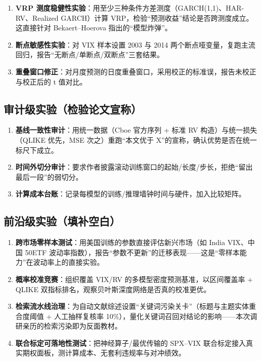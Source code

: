 \documentclass[11pt,a4paper]{article}
\begin{document}
\begin{enumerate}[leftmargin=2.2em]
  \item \textbf{VRP 测度稳健性实验}：用至少三种条件方差测度（GARCH(1,1)、HAR-RV、Realized GARCH）计算 VRP，检验“预测收益”结论是否跨测度成立。这直接针对 Bekaert--Hoerova 指出的“模型炸弹”。
  \item \textbf{断点敏感性实验}：对 VIX 样本设置 2003 与 2014 两个断点哑变量，复跑主流回归，报告“无断点/单断点/双断点”三套结果。
  \item \textbf{重叠窗口修正}：对月度预测的日度重叠窗口，采用校正的标准误，报告未校正与校正后的 t 值对比。
\end{enumerate}

\subsection{审计级实验（检验论文宣称）}

\begin{enumerate}[leftmargin=2.2em]
  \item \textbf{基线一致性审计}：用统一数据（Cboe 官方序列 + 标准 RV 构造）与统一损失（QLIKE 优先，MSE 次之）重跑“本文优于 X”的宣称，确认优势是否在统一标尺下成立。
  \item \textbf{时间外切分审计}：要求作者披露滚动训练窗口的起始/长度/步长，拒绝“留出最后一段”的弱切分。
  \item \textbf{计算成本台账}：记录每模型的训练/推理墙钟时间与硬件，加入比较矩阵。
\end{enumerate}

\subsection{前沿级实验（填补空白）}

\begin{enumerate}[leftmargin=2.2em]
  \item \textbf{跨市场零样本测试}：用美国训练的参数直接评估新兴市场（如 India VIX、中国 50ETF 波动率指数），报告“参数不更新”的迁移表现——这是“零样本能力”在波动率上的直接实验。
  \item \textbf{概率校准竞赛}：组织覆盖 VIX/RV 的多模型密度预测基准，以区间覆盖率 + QLIKE 双指标排名，观察贝叶斯深度网络是否真的校准更优。
  \item \textbf{检索流水线治理}：为自动文献综述设置“关键词污染关卡”（标题与主题实体重合度阈值 + 人工抽样复核率 10\%），量化关键词召回对结论的影响——本次调研亲历的检索污染即为反面教材。
  \item \textbf{联合标定可落地性测试}：把神经算子/最优传输的 SPX--VIX 联合标定接入真实期权面板，测计算成本、无套利违规率与对冲绩效。
\end{enumerate}
\end{document}
